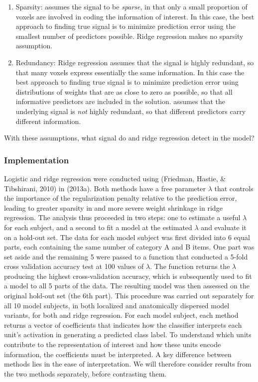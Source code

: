 \begin{enumerate}
\item Sparsity: {\lasso} assumes the signal to be {\em sparse}, in that only a small proportion of voxels are involved in coding the information of interest. In this case, the best approach to finding true signal is to minimize prediction error using the smallest number of predictors possible. Ridge regression makes no sparsity assumption.

\item Redundancy: Ridge regression assumes that the signal is highly redundant, so that many voxels express essentially the same information. In this case the best approach to finding true signal is to minimize prediction error using distributions of weights that are as close to zero as possible, so that all informative predictors are included in the solution. {\lasso} assumes that the underlying signal is {\em not} highly redundant, so that different predictors carry different information.
\end{enumerate}

With these assumptions, what signal do {\lasso} and ridge regression detect in the model?

\subsubsection{Implementation}
Logistic {\lasso} and ridge regression were conducted using {\glmnet} (Friedman, Hastie, \& Tibshirani, 2010) in {\matlab} (2013a). Both methods have a free parameter $\lambda$ that controls the importance of the regularization penalty relative to the prediction error, leading to greater sparsity in {\lasso} and more severe weight shrinkage in ridge regression. The analysis thus proceeded in two steps: one to estimate a useful $\lambda$ for each subject, and a second to fit a model at the estimated $\lambda$ and evaluate it on a hold-out set. The data for each model subject was first divided into 6 equal parts, each containing the same number of category A and B items. One part was set aside and the remaining 5 were passed to a function that conducted a 5-fold cross validation accuracy test at 100 values of $\lambda$. The function returns the $\lambda$ producing the highest cross-validation accuracy, which is subsequently used to fit a model to all 5 parts of the data. The resulting model was then assessed on the original hold-out set (the 6th part). This procedure was carried out separately for all 10 model subjects, in both localized and anatomically dispersed model variants, for both {\lasso} and ridge regression. For each model subject, each method returns a vector of coefficients that indicates how the classifier interprets each unit's activation in generating a predicted class label. To understand which units contribute to the representation of interest and how these units encode information, the coefficients must be interpreted. A key difference between methods lies in the ease of interpretation. We will therefore consider results from the two methods separately, before contrasting them.

